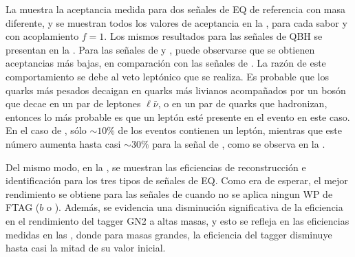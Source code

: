 La \Tab{\ref{tab:signals:acc_eff:acceptances}} muestra la aceptancia medida para dos señales de \ac{EQ} de referencia con masa diferente, y se muestran todos los valores de aceptancia en la \Fig{\ref{fig:signals:acc_eff:acceptances:qstar}}, para cada sabor y con acoplamiento \(f=1\). Los mismos resultados para las señales de \ac{QBH} se presentan en la \Fig{\ref{fig:signals:acc_eff:acceptances:qbh}}.
Para las señales de \cstar y \bstar, puede observarse que se obtienen aceptancias más bajas, en comparación con las señales de \qstar. La razón de este comportamiento se debe al veto leptónico que se realiza. Es probable que los quarks más pesados decaigan en quarks más livianos acompañados por un bosón \Wboson que decae en un par de leptones \(\ell \bar{\nu}\), o en un par de quarks que hadronizan, entonces lo más probable es que un leptón esté presente en el evento en este caso. En el caso de \qstar, sólo \(\sim 10\%\) de los eventos contienen un leptón, mientras que este número aumenta hasta casi \(\sim 30\%\) para la señal de \bstar, como se observa en la \Tab{\ref{tab:signals:acc_eff:acceptances}}.

Del mismo modo, en la \Fig{\ref{fig:signals:acc_eff:efficiencies}}, se muestran las eficiencias de reconstrucción e identificación para los tres tipos de señales de \ac{EQ}. Como era de esperar, el mejor rendimiento se obtiene para las señales de \qstar cuando no se aplica ningun \ac{WP} de \ac{FTAG} (\(b\) o \ctagging). Además, se evidencia una disminución significativa de la eficiencia en el rendimiento del tagger GN2 a altas masas, y esto se refleja en las eficiencias medidas en las \Figs{\ref{fig:signals:acc_eff:efficiencies:cstar}}{\ref{fig:signals:acc_eff:efficiencies:bstar}}, donde para masas grandes, la eficiencia del tagger disminuye hasta casi la mitad de su valor inicial.

